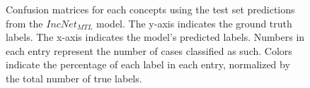 \begin{figure}[ht]
\caption{Confusion matrices for each concepts using the test set predictions
from the $IncNet_{MTL}$ model. The y-axis indicates the ground truth labels. The
x-axis indicates the model’s predicted labels. Numbers in each entry represent
the number of cases classified as such. Colors indicate the percentage of each
label in each entry, normalized by the total number of true labels.}
\label{CMincNetMTL}
\end{figure}

\clearpage

